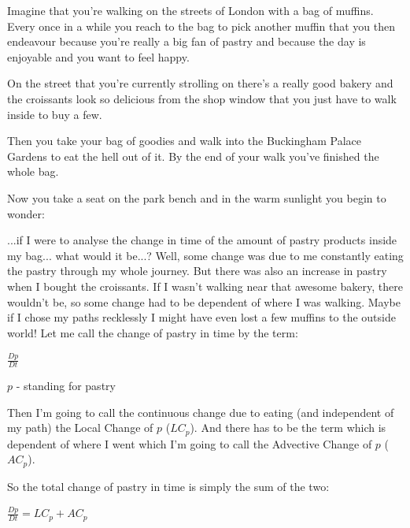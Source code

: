 \documentclass[12pt]{report}
\begin{document}
Imagine that you're walking on the streets of London with a bag of muffins. Every once in a while you reach to the bag to pick another muffin that you then endeavour because you're really a big fan of pastry and because the day is enjoyable and you want to feel happy.

On the street that you're currently strolling on there's a really good bakery and the croissants look so delicious from the shop window that you just have to walk inside to buy a few.

Then you take your bag of goodies and walk into the Buckingham Palace Gardens to eat the hell out of it. By the end of your walk you've finished the whole bag.

Now you take a seat on the park bench and in the warm sunlight you begin to wonder:

...if I were to analyse the change in time of the amount of pastry products inside my bag... what would it be...? Well, some change was due to me constantly eating the pastry through my whole journey. But there was also an increase in pastry when I bought the croissants. If I wasn't walking near that awesome bakery, there wouldn't be, so some change had to be dependent of where I was walking. Maybe if I chose my paths recklessly I might have even lost a few muffins to the outside world! Let me call the change of pastry in time by the term:

$\frac{Dp}{Dt}$

$p$ - standing for pastry

Then I'm going to call the continuous change due to eating (and independent of my path) the Local Change of $p$ ($LC_p$). And there has to be the term which is dependent of where I went which I'm going to call the Advective Change of $p$ ($AC_p$).

So the total change of pastry in time is simply the sum of the two:

$\frac{Dp}{Dt} = LC_p + AC_p$













\newpage

\begin{thebibliography}{50}



\end{thebibliography}
\end{document}
